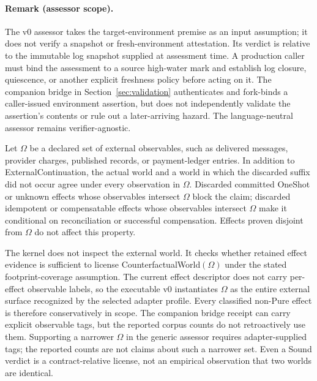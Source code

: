 \paragraph{Remark (assessor scope).}
The v0 assessor takes the target-environment premise as an input assumption; it
does not verify a snapshot or fresh-environment attestation.  Its verdict is
relative to the immutable log snapshot supplied at assessment time.  A
production caller must bind the assessment to a source high-water mark and
establish log closure, quiescence, or another explicit freshness policy before
acting on it.  The companion bridge in Section~\ref{sec:validation}
authenticates and fork-binds a caller-issued environment assertion, but does not
independently validate the assertion's contents or rule out a later-arriving
hazard.  The language-neutral assessor remains verifier-agnostic.

\begin{definition}
Let $\Omega$ be a declared set of external observables, such as delivered
messages, provider charges, published records, or payment-ledger entries.  In
addition to ExternalContinuation, the actual world and a world in which the
discarded suffix did not occur agree under every observation in $\Omega$.
Discarded committed OneShot or unknown effects whose observables intersect
$\Omega$ block the claim; discarded idempotent or compensatable effects whose
observables intersect $\Omega$ make it conditional on reconciliation or
successful compensation.  Effects proven disjoint from $\Omega$ do not affect
this property.
\end{definition}

The kernel does not inspect the external world.  It checks whether retained
effect evidence is sufficient to license CounterfactualWorld$(\Omega)$ under
the stated footprint-coverage assumption.  The current effect descriptor does
not carry per-effect observable labels, so the executable v0 instantiates
$\Omega$ as the entire external surface recognized by the selected adapter
profile.  Every classified non-Pure effect is therefore conservatively in
scope.  The companion bridge receipt can carry explicit observable tags, but
the reported corpus counts do not retroactively use them.  Supporting a
narrower $\Omega$ in the generic assessor requires adapter-supplied tags; the
reported counts are not claims about such a narrower set.  Even a Sound verdict
is a contract-relative license, not an empirical observation that two worlds
are identical.

